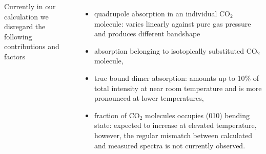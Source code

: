 \documentclass[
  20pt,
  a0paper,
  portrait,
  margin=0mm,
  innermargin=15mm,
  blockverticalspace=0mm,
  colspace=0mm,
  subcolspace=0mm
]{tikzposter}
\begin{document}
\begin{columns}
{    Currently in our calculation we disregard the following contributions and factors
    \begin{itemize}
        \setlength\itemsep{0.2em}
        \item quadrupole absorption in an individual CO$_2$ molecule: varies linearly against pure gas pressure and produces different bandshape
        \item absorption belonging to isotopically substituted CO$_2$ molecule,
        \item true bound dimer absorption: amounts up to 10\% of total intensity at near room temperature and is more pronounced at lower temperatures,
        \item fraction of CO$_2$ molecules occupies (010) bending state: expected to increase at elevated temperature, however, the regular mismatch between calculated and measured spectra is not currently observed.
    \end{itemize}
}
\fi


\end{columns}
\end{document}
